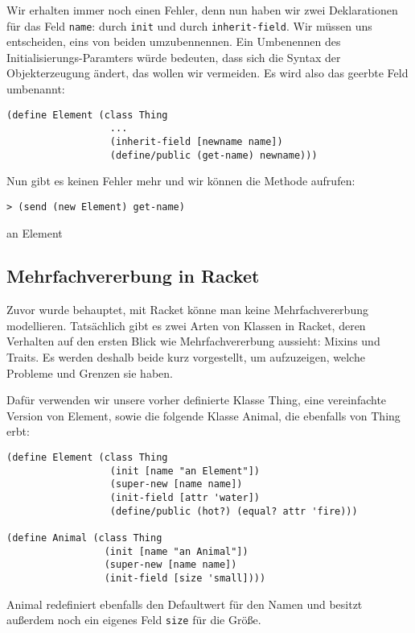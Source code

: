 Wir erhalten immer noch einen Fehler, denn nun haben wir zwei Deklarationen für das Feld \texttt{name}: durch \texttt{init} und durch \texttt{inherit-field}. Wir müssen uns entscheiden, eins von beiden umzubennennen. Ein Umbenennen des Initialisierungs-Paramters würde bedeuten, dass sich die Syntax der Objekterzeugung ändert, das wollen wir vermeiden. Es wird also das geerbte Feld umbenannt:

\begin{lstlisting}
(define Element (class Thing 
                  ...
                  (inherit-field [newname name])
                  (define/public (get-name) newname)))
\end{lstlisting}

Nun gibt es keinen Fehler mehr und wir können die Methode aufrufen:

\begin{lstlisting}
> (send (new Element) get-name)
\end{lstlisting}
{\routput {\qq}an Element\qq}

\subsection{Mehrfachvererbung in Racket}
\label{mixins}
Zuvor wurde behauptet, mit Racket könne man keine Mehrfachvererbung modellieren. Tatsächlich gibt es zwei Arten von Klassen in Racket, deren Verhalten auf den ersten Blick wie Mehrfachvererbung aussieht: Mixins und Traits. Es werden deshalb beide kurz vorgestellt, um aufzuzeigen, welche Probleme und Grenzen sie haben.

Dafür verwenden wir unsere vorher definierte Klasse Thing, eine vereinfachte Version von Element, sowie die folgende Klasse Animal, die ebenfalls von Thing erbt:

\begin{lstlisting}
(define Element (class Thing 
                  (init [name "an Element"])
                  (super-new [name name])
                  (init-field [attr 'water])
                  (define/public (hot?) (equal? attr 'fire)))

(define Animal (class Thing
                 (init [name "an Animal"])
                 (super-new [name name])
                 (init-field [size 'small])))
\end{lstlisting}

Animal redefiniert ebenfalls den Defaultwert für den Namen und besitzt außerdem noch ein eigenes Feld \texttt{size} für die Größe.

